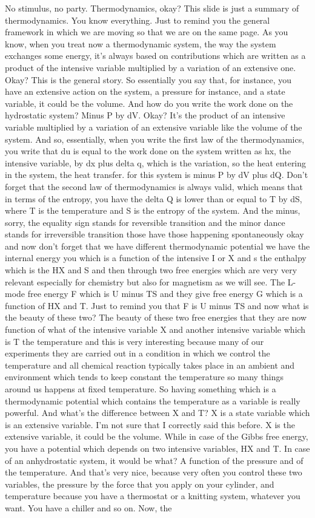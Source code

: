 No stimulus, no party. Thermodynamics, okay? This slide is just a summary of thermodynamics. You know everything. Just to remind you the general framework in which we are moving so that we are on the same page. As you know, when you treat now a thermodynamic system, the way the system exchanges some energy, it's always based on contributions which are written as a product of the intensive variable multiplied by a variation of an extensive one. Okay? This is the general story. So essentially you say that, for instance, you have an extensive action on the system, a pressure for instance, and a state variable, it could be the volume. And how do you write the work done on the hydrostatic system? Minus P by dV. Okay? It's the product of an intensive variable multiplied by a variation of an extensive variable like the volume of the system. And so, essentially, when you write the first law of the thermodynamics, you write that du is equal to the work done on the system written as hx, the intensive variable, by dx plus delta q, which is the variation, so the heat entering in the system, the heat transfer. for this system is minus P by dV plus dQ. Don't forget that the second law of thermodynamics is always valid, which means that in terms of the entropy, you have the delta Q is lower than or equal to T by dS, where T is the temperature and S is the entropy of the system. And the minus, sorry, the equality sign stands for reversible transition and the minor dance stands for irreversible transition those have those happening spontaneously okay and now don't forget that we have different thermodynamic potential we have the internal energy you which is a function of the intensive I or X and s the enthalpy which is the HX and S and then through two free energies which are very very relevant especially for chemistry but also for magnetism as we will see. The L-mode free energy F which is U minus TS and they give free energy G which is a function of HX and T. Just to remind you that F is U minus TS and now what is the beauty of these two? The beauty of these two free energies that they are now function of what of the intensive variable X and another intensive variable which is T the temperature and this is very interesting because many of our experiments they are carried out in a condition in which we control the temperature and all chemical reaction typically takes place in an ambient and environment which tends to keep constant the temperature so many things around us happens at fixed temperature. So having something which is a thermodynamic potential which contains the temperature as a variable is really powerful. And what's the difference between X and T? X is a state variable which is an extensive variable. I'm not sure that I correctly said this before. X is the extensive variable, it could be the volume. While in case of the Gibbs free energy, you have a potential which depends on two intensive variables, HX and T. In case of an anhydrostatic system, it would be what? A function of the pressure and of the temperature. And that's very nice, because very often you control these two variables, the pressure by the force that you apply on your cylinder, and temperature because you have a thermostat or a knitting system, whatever you want. You have a chiller and so on. Now, the 
